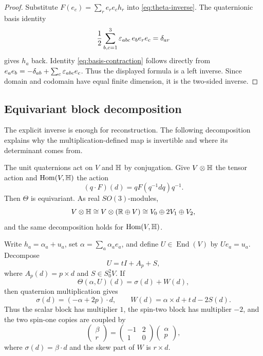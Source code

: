 \begin{proof}
Substitute $F(e_c)=\sum_r e_r e_c h_r$ into \eqref{eq:theta-inverse}.  The quaternionic basis identity
\begin{equation}\label{eq:basis-contraction}
  \frac12\sum_{b,c=1}^3\varepsilon_{abc}\,e_be_re_c=\delta_{ar}
\end{equation}
gives $h_a$ back.  Identity \eqref{eq:basis-contraction} follows directly from $e_ae_b=-\delta_{ab}+\sum_c\varepsilon_{abc}e_c$.  Thus the displayed formula is a left inverse.  Since domain and codomain have equal finite dimension, it is the two-sided inverse.
\end{proof}

\subsection{Equivariant block decomposition}

The explicit inverse is enough for reconstruction.  The following decomposition explains why the multiplication-defined map is invertible and where its determinant comes from.

The unit quaternions act on $V$ and $\mathbb H$ by conjugation.  Give $V\otimes\mathbb H$ the tensor action and $\operatorname{Hom}(V,\mathbb H)$ the action
\[
  (q\cdot F)(d)=qF(q^{-1}dq)q^{-1}.
\]
Then $\Theta$ is equivariant.  As real $SO(3)$-modules,
\begin{equation}\label{eq:theta-modules}
  V\otimes\mathbb H
  \cong V\otimes(\mathbb R\oplus V)
  \cong V_0\oplus 2V_1\oplus V_2,
\end{equation}
and the same decomposition holds for $\operatorname{Hom}(V,\mathbb H)$.

Write $h_a=\alpha_a+u_a$, set $\alpha=\sum_a\alpha_ae_a$, and define $U\in\operatorname{End}(V)$ by $Ue_a=u_a$.  Decompose
\[
  U=tI+A_p+S,
\]
where $A_p(d)=p\times d$ and $S\in S^2_0V$.  If
\[
  \Theta(\alpha,U)(d)=\sigma(d)+W(d),
\]
then quaternion multiplication gives
\begin{equation}\label{eq:theta-block-formulas}
  \sigma(d)=(-\alpha+2p)\cdot d,
  \qquad
  W(d)=\alpha\times d+t\,d-2S(d).
\end{equation}
Thus the scalar block has multiplier $1$, the spin-two block has multiplier $-2$, and the two spin-one copies are coupled by
\begin{equation}\label{eq:spin-one-matrix}
  \begin{pmatrix}\beta\\ r\end{pmatrix}
  =
  \begin{pmatrix}-1&2\\1&0\end{pmatrix}
  \begin{pmatrix}\alpha\\p\end{pmatrix},
\end{equation}
where $\sigma(d)=\beta\cdot d$ and the skew part of $W$ is $r\times d$.

